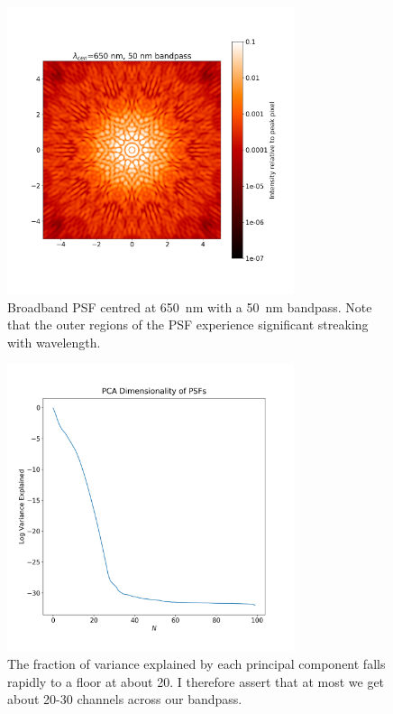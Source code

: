\documentclass[a4paper,12pt]{article}
\begin{document}
\begin{figure}
\centering
\includegraphics[width=0.75\textwidth]{psf_650nm_50nmbpass.png}
\caption{Broadband PSF centred at 650~nm with a 50~nm bandpass. Note that the outer regions of the PSF experience significant streaking with wavelength.}
\label{broadband}
\end{figure}



\begin{figure}
\centering
\includegraphics[width=0.75\textwidth]{dimension.png}
\caption{The fraction of variance explained by each principal component falls rapidly to a floor at about 20. I therefore assert that at most we get about 20-30 channels across our bandpass.}
\label{zeroth}
\end{figure}
\end{document}
